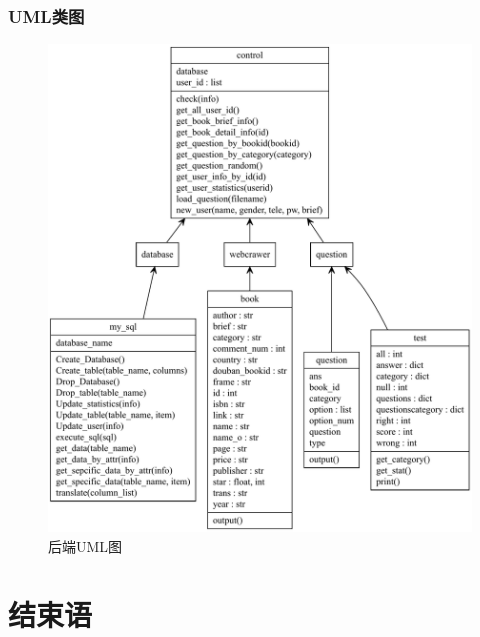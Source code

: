 \documentclass[twoside,11pt]{article}
\begin{document}
\subsubsection{UML类图}
\begin{figure}[htbp]
    \includegraphics[width=1\columnwidth]{figures/backenduml.pdf}
    \caption{后端UML图}
    \label{fig:backenduml}
\end{figure}

\newpage
\section{结束语}
\end{document}
